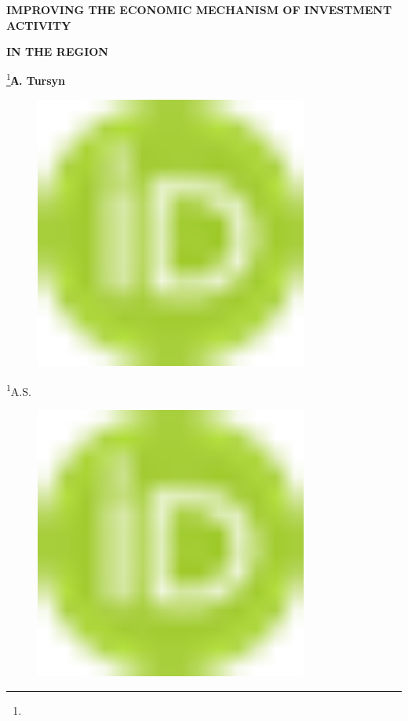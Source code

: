 
{\bfseries IMPROVING THE ECONOMIC MECHANISM OF INVESTMENT ACTIVITY}

{\bfseries IN THE REGION}

\footnote{}{\bfseries А. Tursyn\textsuperscript{\envelope }}
\begin{figure}[H]
	\centering
	\includegraphics[width=0.8\textwidth]{media/ekon2/image1}
	\caption*{}
\end{figure}

\textsuperscript{1}A.S.
\begin{figure}[H]
	\centering
	\includegraphics[width=0.8\textwidth]{media/ekon2/image1}
	\caption*{}
\end{figure}

